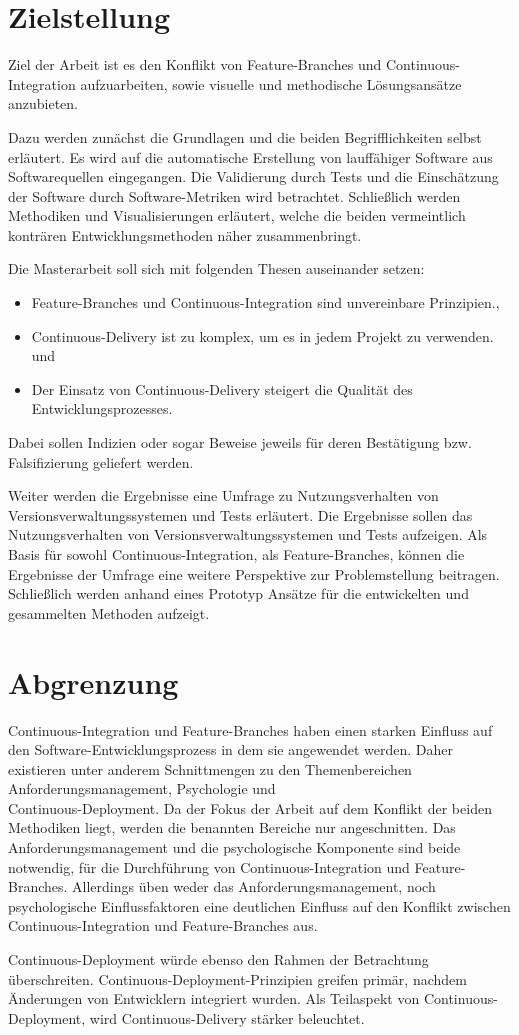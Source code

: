 \section{Zielstellung}

Ziel der Arbeit ist es den Konflikt von \glqq Feature-Branches\grqq{} und \glqq Continuous-Integration\grqq{} aufzuarbeiten, sowie visuelle und methodische Lösungsansätze anzubieten. 

Dazu werden zunächst die Grundlagen und die beiden Begrifflichkeiten selbst erläutert. Es wird auf die automatische Erstellung von lauffähiger Software aus Softwarequellen eingegangen. Die Validierung durch Tests und die Einschätzung der Software durch Software-Metriken wird betrachtet. Schließlich werden Methodiken und Visualisierungen erläutert, welche die beiden vermeintlich konträren Entwicklungsmethoden näher zusammenbringt.

Die Masterarbeit soll sich mit folgenden Thesen auseinander setzen:
\begin{itemize}
\item \glqq Feature-Branches und Continuous-Integration sind unvereinbare Prinzipien.\grqq{},
\item \glqq Continuous-Delivery ist zu komplex, um es in jedem Projekt zu verwenden.\grqq{} und
\item \glqq Der Einsatz von Continuous-Delivery steigert die Qualität des Entwicklungsprozesses.\grqq{}
\end{itemize}
Dabei sollen Indizien oder sogar Beweise jeweils für deren Bestätigung bzw. Falsifizierung geliefert werden.

Weiter werden die Ergebnisse eine Umfrage zu \glqq Nutzungsverhalten von Versionsverwaltungssystemen und Tests\grqq{} erläutert. Die Ergebnisse sollen das Nutzungsverhalten von Versionsverwaltungssystemen und Tests aufzeigen. Als Basis für sowohl Continuous-Integration, als Feature-Branches, können die Ergebnisse der Umfrage eine weitere Perspektive zur Problemstellung beitragen. Schließlich werden anhand eines Prototyp Ansätze für die entwickelten und gesammelten Methoden aufzeigt.

\section{Abgrenzung}

Continuous-Integration und Feature-Branches haben einen starken Einfluss auf den Software-Entwicklungsprozess in dem sie angewendet werden. Daher existieren unter anderem Schnittmengen zu den Themenbereichen Anforderungsmanagement, Psychologie und \\Continuous-Deployment. 
Da der Fokus der Arbeit auf dem Konflikt der beiden Methodiken liegt, werden die benannten Bereiche nur angeschnitten. Das Anforderungsmanagement und die psychologische Komponente sind beide notwendig, für die Durchführung von Continuous-Integration und Feature-Branches. Allerdings üben weder das Anforderungsmanagement, noch psychologische Einflussfaktoren eine deutlichen Einfluss auf den Konflikt zwischen Continuous-Integration und Feature-Branches aus. 

Continuous-Deployment würde ebenso den Rahmen der Betrachtung überschreiten. Continuous-Deployment-Prinzipien greifen primär, nachdem Änderungen von Entwicklern integriert wurden. Als Teilaspekt von Continuous-Deployment, wird Continuous-Delivery stärker beleuchtet.